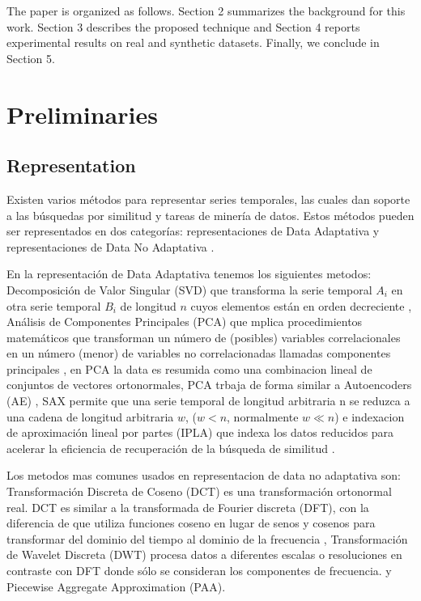 \documentclass{article}
\begin{document}
 
The paper is organized as follows. Section 2 summarizes the background for this work. Section 3 describes the proposed technique and Section 4 reports experimental results on real and synthetic datasets. Finally, we conclude in Section 5.
 
\section{Preliminaries}

\subsection{Representation}  %
     	
Existen varios métodos para representar series temporales, las cuales dan soporte a las búsquedas por similitud y tareas de minería de datos. Estos métodos pueden ser representados en dos categorías: representaciones de Data Adaptativa y representaciones de Data No Adaptativa \cite{wang13}.  

En la representación de Data Adaptativa tenemos los siguientes metodos: Decomposición de Valor Singular (SVD)  que transforma la serie temporal $A_i$ en otra serie temporal $B_i$ de longitud $n$ cuyos elementos están en  orden decreciente \cite{Bettaiah14}, Análisis de Componentes Principales (PCA) que mplica procedimientos matemáticos que transforman un número de (posibles) variables correlacionales en un número (menor) de variables no correlacionadas llamadas componentes principales \cite{wekwek}, en PCA la data es resumida como una combinacion lineal de conjuntos de vectores ortonormales, PCA trbaja de forma similar a  Autoencoders (AE) , SAX permite que una serie temporal de longitud arbitraria n se reduzca a una cadena de longitud arbitraria $ w $, ($ w <n $, normalmente $ w \ll n $) \cite{Lin07} e indexacion de aproximación lineal por partes (IPLA)  que indexa los datos reducidos para acelerar la eficiencia de recuperación de la búsqueda de similitud \cite{Chen07}.

Los metodos mas comunes usados en representacion de data no adaptativa son:  Transformación Discreta de Coseno (DCT) es una transformación ortonormal real. DCT es similar a la transformada de Fourier discreta (DFT), con la diferencia de que utiliza funciones coseno en lugar de senos y cosenos para transformar del dominio del tiempo al dominio de la frecuencia \cite{Bettaiah14}, Transformación de Wavelet Discreta (DWT) procesa datos a diferentes escalas o resoluciones en contraste con DFT \cite{Faloutsos94} donde sólo se consideran los componentes de frecuencia.\cite{Bettaiah14} y Piecewise Aggregate Approximation (PAA).
\end{document}
